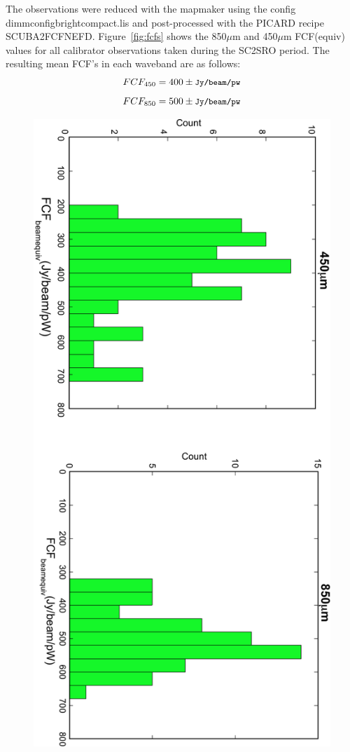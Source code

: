 \documentclass[twoside,11pt]{article}
\renewcommand{\_}{\texttt{\symbol{95}}}
\newcommand{\text}[1]{{\small \texttt{#1}}}
\begin{document}
The observations were reduced with the mapmaker using the config
dimmconfig\_bright\_compact.lis and post-processed with the PICARD
recipe SCUBA2\_FCFNEFD. Figure~\ref{fig:fcfs} shows the 850$\mu$m and
450$\mu$m FCF(equiv) values for all calibrator observations taken
during the SC2SRO period. The resulting mean FCF's in each waveband
are as follows:
\begin{equation}
FCF_{450} = 400 \pm \text{Jy/beam/pw}
\end{equation}
\begin{equation}
FCF_{850} = 500 \pm \text{Jy/beam/pw}
\end{equation}

\begin{figure}
\begin{center}
\includegraphics[width=\linewidth]{sc19_fcf_hist}

\end{center}
\end{figure}
\end{document}
